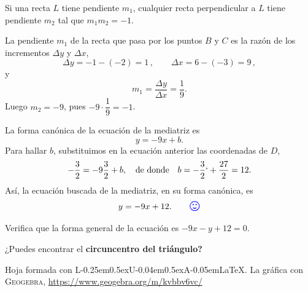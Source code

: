 \documentclass[12pt,letterpaper]{article}
\newcommand{\LuaLaTeX}{L\kern-0.25em\raise0.5ex\hbox{\tiny U}\kern-0.04em\raise0.5ex\hbox{\tiny A}\kern-0.05em\LaTeX}
\newcommand{\fej}{\relax\hfill\ifmmode{\lower.5ex\hbox{{\textcolor{blue}{\LARGE\smiley al 15pt}}}}\else\lower.5ex\hbox{{\textcolor{blue}{\LARGE \smiley}}}}  %
\begin{document}
Si una recta $L$ tiene pendiente $m_1$, cualquier recta perpendicular a $L$ tiene pendiente $m_2$ tal que $m_1m_2=-1$.

La pendiente $m_1$ de la recta que pasa por los puntos $B$ y $C$ es la razón de los incrementos $\Delta y$ y $\Delta x$,
\begin{equation*}
\Delta y = -1-(-2) = 1\,,\qquad
\Delta x = 6-(-3) = 9\,,
\end{equation*}
y
$$m_1=\frac{\Delta y}{\Delta x} =  \frac{1}{9}.$$
Luego $m_2=-9$, pues $-9\cdot\dfrac{1}{9}=-1$.

La forma canónica de la ecuación de la mediatriz es
$$y=-9x+b.$$
Para hallar $b$, substituimos en la ecuación anterior las coordenadas de $D$,
$$-\frac{3}{2}=-9\frac{3}{2}+b,\quad\text{de donde}\quad b=-\frac{3}{2}`+\frac{27}{2}=12.$$
Así, la ecuación buscada de la mediatriz, en su forma canónica, es
\[y=-9x+12.\tag*{\fej}\]

Verifica que la forma general de la ecuación es $-9x-y+12=0$.

¿Puedes encontrar el \textbf{\color{purple}circuncentro del triángulo?}






\vfill 

\begin{center}
	{\footnotesize\color{olive} Hoja formada con \LuaLaTeX. La gráfica con \textsc{Geogebra}, \url{https://www.geogebra.org/m/kvbbv6vc/}}
\end{center}
\end{document}
